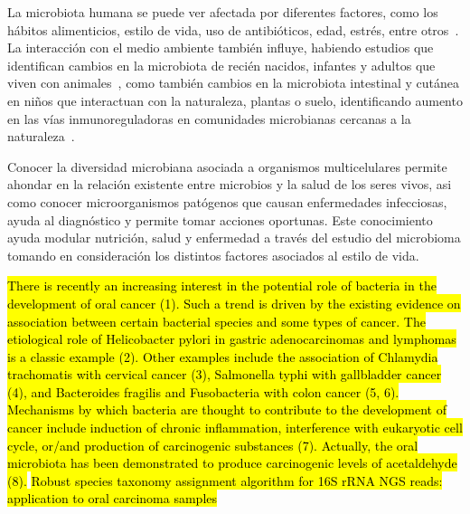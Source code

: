 La microbiota humana se puede ver afectada por diferentes factores, como los hábitos alimenticios, estilo de vida, uso de antibióticos, edad, estrés, entre otros~\cite{altvecs2020interaction}. 
La interacción con el medio ambiente también influye, habiendo estudios que identifican cambios en la microbiota de recién nacidos, infantes y adultos que viven con animales~\cite{tun2017exposure, azad2013infant,kates2020household}, como también cambios en la microbiota intestinal y cutánea en niños que interactuan con la naturaleza, plantas o suelo, identificando aumento en las vías inmunoreguladoras en comunidades microbianas cercanas a la naturaleza~\cite{roslund2020biodiversity}.




Conocer la diversidad microbiana asociada a organismos multicelulares permite ahondar en la relación existente entre microbios y la salud de los seres vivos, asi como conocer microorganismos patógenos que causan enfermedades infecciosas, ayuda al diagnóstico y permite tomar acciones oportunas. 
Este conocimiento ayuda modular nutrición, salud y enfermedad a través del estudio del microbioma tomando en consideración los distintos factores asociados al estilo de vida.



\hl{There is recently an increasing interest in the potential role of bacteria in the development of oral cancer (1). Such a trend is driven by the existing evidence on association between certain bacterial species and some types of cancer. The etiological role of Helicobacter pylori in gastric adenocarcinomas and lymphomas is a classic example (2). Other examples include the association of Chlamydia trachomatis with cervical cancer (3), Salmonella typhi with gallbladder cancer (4), and Bacteroides fragilis and Fusobacteria with colon cancer (5, 6). Mechanisms by which bacteria are thought to contribute to the development of cancer include induction of chronic inflammation, interference with eukaryotic cell cycle, or/and production of carcinogenic substances (7). Actually, the oral microbiota has been demonstrated to produce carcinogenic levels of acetaldehyde (8).}
\hl{Robust species taxonomy assignment algorithm for 16S rRNA NGS reads: application to oral carcinoma samples}
